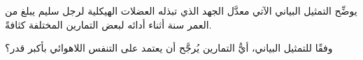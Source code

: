 
\begin{question}

\begin{instance}
  
\begin{mcq}[standalone=false]
    
\begin{stem}
      يوضِّح التمثيل البياني الآتي معدَّل الجهد الذي تبذله العضلات الهيكلية لرجل سليم يبلغ من العمر  سنة أثناء أدائه لبعض التمارين المختلفة كثافةً.\par      {}      وفقًا للتمثيل البياني، أيُّ التمارين يُرجَّح أن يعتمد على التنفس اللاهوائي بأكبر قدر؟ \par    
\end{stem}
    
\begin{distractors}
        
\end{distractors}
              
\end{mcq}

\end{instance}

\end{question}
